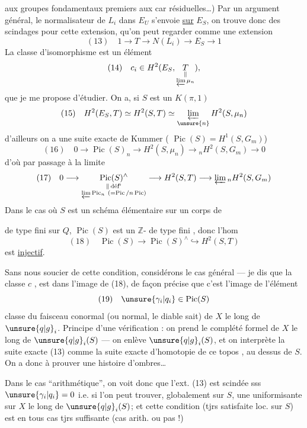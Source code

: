 aux groupes fondamentaux premiers aux car résiduelles\dots) Par un argument général, le normalisateur de $L_i$ dans $E_U$ s'envoie \uline{sur} $E_S$, on trouve donc des scindages pour cette extension, qu'on peut regarder comme une extension
\[
(13)\quad 1\longrightarrow T\longrightarrow N(L_i)\longrightarrow E_S\longrightarrow1
\]
La classe d'isomorphisme est un élément 
\[
(14)\quad c_i\in H^2(E_S,\underset{\substack{\Vert\\\varprojlim\mu_n}}{T}),
\]
que je me propose d'étudier. On a, si $S$ est un $K(\pi,1)$
\[
(15)\quad H^2(E_S,T)\simeq H^2(S,T)\simeq\varprojlim_{\unsure{n}} H^2(S,\mu_n)
\]
d'ailleurs on a une suite exacte de Kummer ( $\operatorname{Pic}(S)=H^1(S,G_m)$)
\[
(16)\quad 0\longrightarrow\operatorname{Pic}(S)_n\longrightarrow H^2(S,\mu_n)\longrightarrow {}_nH^2(S,G_m)\longrightarrow0
\]
d'où par passage à la limite
\[
(17)\quad 0\longrightarrow
\underset{\substack{\Vert\,\text{déf}\!^{\mathrm n}\\\varprojlim\operatorname{Pic}_n\ (=\operatorname{Pic}/n\operatorname{Pic})}}{\operatorname{Pic}(S)^\wedge}
\longrightarrow H^2(S,T)\longrightarrow\varprojlim {}_nH^2(S,G_m)
\]
Dans le cas où $S$ est un schéma élémentaire sur un corps de  

de type fini sur $Q$, $\operatorname{Pic}(S)$ est un $\mathbb Z$- de type fini , donc l'hom
\[
(18)\quad \operatorname{Pic}(S)\longrightarrow\operatorname{Pic}(S)^\wedge\hookrightarrow H^2(S,T)
\]
est \uline{injectif}.

Sans nous soucier de cette condition,  considérons le cas général --- je dis que la classe  $c$ , est dans l'image de (18), de façon précise que c'est l'image de l'élément
\[
(19)\quad \unsure{\gamma_i|q_i}\in\operatorname{Pic}(S)
\]
classe du faisceau conormal (ou normal, le diable sait) de $X$ le long de $\unsure{q|g}_i$. Principe d'une vérification : on prend le complété formel de $X$ le long de $\unsure{q|g}_i(S)$    --- on enlève $\unsure{q|g}_i(S)$, et on interprète la suite exacte (13) comme la suite exacte d'homotopie de ce  topos , au dessus de  $S$. On a donc à prouver une histoire d'ombres\dots
{}

Dans le cas ``arithmétique'', on voit donc que l'ext. (13) est scindée sss $\unsure{\gamma_i|q_i}=0$ i.e. si l'on peut trouver, globalement sur $S$, une uniformisante sur $X$ le long de $\unsure{q|g}_i(S)$; et cette condition (tjrs satisfaite loc. sur $S$) est en tous cas tjrs suffisante (cas arith. ou pas !)

